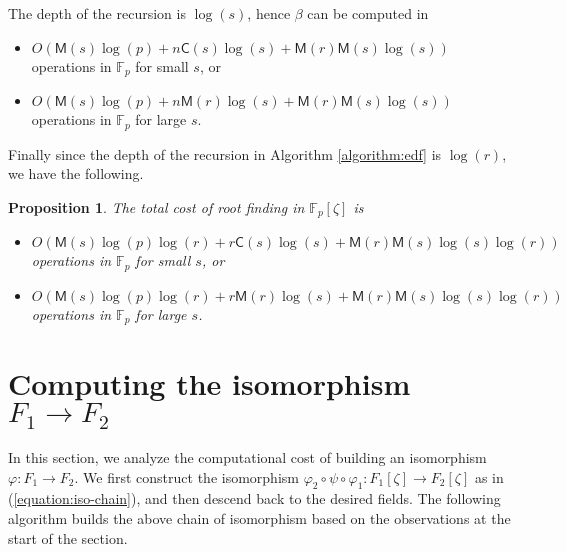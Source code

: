 \documentclass[12pt]{article}
\theoremstyle{plain}
\newtheorem{proposition}[theorem]{Proposition}
\theoremstyle{definition}
\def\F{\mathbb{F}}
\def\M{\mathsf{M}}
\def\CC{\mathsf{C}}
\newcounter{algorithm}
\begin{document}
The depth of the recursion is $\log(s)$, hence $\beta$ can be computed in
\begin{itemize}
	\item $O(\M(s)\log(p) + n\CC(s)\log(s) + \M(r)\M(s)\log(s))$ operations in $\F_p$ for small $s$, or
	\item $O(\M(s)\log(p) + n\M(r)\log(s) + \M(r)\M(s)\log(s))$ operations in $\F_p$ for large $s$.
\end{itemize} 
Finally since the depth of the recursion in Algorithm \ref{algorithm:edf} is $\log(r)$, we have the following.
\begin{proposition}
\label{proposition:root-fpz}
	The total cost of root finding in $\F_p[\zeta]$ is
	\begin{itemize}
		\item $O(\M(s)\log(p)\log(r) + r\CC(s)\log(s) + \M(r)\M(s)\log(s)\log(r))$\\ operations in $\F_p$ for small $s$, or
		\item $O(\M(s)\log(p)\log(r) + r\M(r)\log(s) + \M(r)\M(s)\log(s)\log(r))$\\ operations in $\F_p$ for large $s$.
	\end{itemize}
\end{proposition}






\section{Computing the isomorphism $F_1 \rightarrow F_2$}

In this section, we analyze the computational cost of building an isomorphism $\varphi: F_1 \rightarrow F_2$. We first construct the isomorphism $\varphi_2 \circ \psi \circ \varphi_1 : F_1[\zeta] \rightarrow F_2[\zeta]$ as in (\ref{equation:iso-chain}), and then descend back to the desired fields. The following algorithm builds the above chain of isomorphism based on the observations at the start of the section. 
\end{document}
